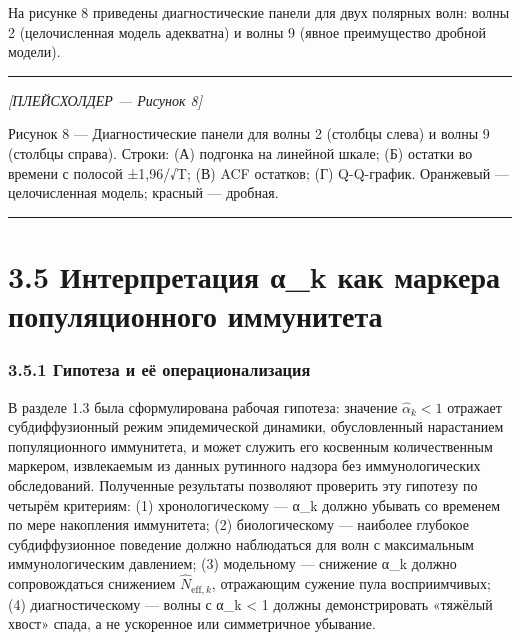 \documentclass[12pt]{article}
\begin{document}
На рисунке 8 приведены диагностические панели для двух полярных волн:
волны 2 (целочисленная модель адекватна) и волны 9 (явное преимущество
дробной модели).

\begin{center}\rule{0.5\linewidth}{0.5pt}\end{center}

\emph{{[}ПЛЕЙСХОЛДЕР --- Рисунок 8{]}}

Рисунок 8 --- Диагностические панели для волны 2 (столбцы слева) и волны
9 (столбцы справа). Строки: (А) подгонка на линейной шкале; (Б) остатки
во времени с полосой ±1,96/√T; (В) ACF остатков; (Г) Q-Q-график.
Оранжевый --- целочисленная модель; красный --- дробная.

\begin{center}\rule{0.5\linewidth}{0.5pt}\end{center}

\section{3.5 Интерпретация α\_k как маркера популяционного
иммунитета}\label{ux438ux43dux442ux435ux440ux43fux440ux435ux442ux430ux446ux438ux44f-ux3b1_k-ux43aux430ux43a-ux43cux430ux440ux43aux435ux440ux430-ux43fux43eux43fux443ux43bux44fux446ux438ux43eux43dux43dux43eux433ux43e-ux438ux43cux43cux443ux43dux438ux442ux435ux442ux430}

\subsubsection{3.5.1 Гипотеза и её
операционализация}\label{ux433ux438ux43fux43eux442ux435ux437ux430-ux438-ux435ux451-ux43eux43fux435ux440ux430ux446ux438ux43eux43dux430ux43bux438ux437ux430ux446ux438ux44f}

В разделе 1.3 была сформулирована рабочая гипотеза: значение
\(\hat{\alpha}_k < 1\) отражает субдиффузионный режим эпидемической
динамики, обусловленный нарастанием популяционного иммунитета, и может
служить его косвенным количественным маркером, извлекаемым из данных
рутинного надзора без иммунологических обследований. Полученные
результаты позволяют проверить эту гипотезу по четырём критериям: (1)
хронологическому --- α\_k должно убывать со временем по мере накопления
иммунитета; (2) биологическому --- наиболее глубокое субдиффузионное
поведение должно наблюдаться для волн с максимальным иммунологическим
давлением; (3) модельному --- снижение α\_k должно сопровождаться
снижением \(\hat{N}_{\text{eff},k}\), отражающим сужение пула
восприимчивых; (4) диагностическому --- волны с α\_k \textless{} 1
должны демонстрировать «тяжёлый хвост» спада, а не ускоренное или
симметричное убывание.
\end{document}
